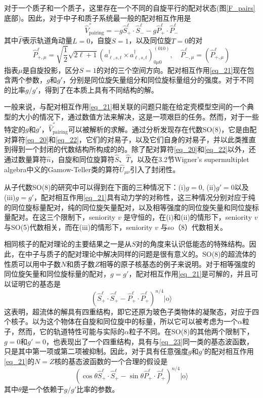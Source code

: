 对于一个质子和一个质子，这里存在一个不同的自旋平行的配对状态(图\ref{F_pairs}底部)。因此，对于中子和质子系统最一般的配对相互作用是
\begin{equation}\label{eq_21}
\hat{V}^{''}_\textrm{pairing}=-g\hat{S}^\ell_+\cdot\hat{S}^\ell_--g\hat{P}^\ell_+\cdot\hat{P}^\ell_-
\end{equation}
其中$\hat{P}$表示轨道角动量$L=0$，自旋$S=1$，以及同位旋$T=0$的对
\begin{equation}\label{eq_22}
\hat{P}^\ell_{+,\mu}=\sqrt{\frac{1}{2}}\sqrt{2\ell+1}(a^\dag_{\ell,s,t}\times a^\dag_{\ell,s,t})^{(010)}_{0\mu 0},\quad\hat{P}^\ell_{-,\mu}=\left(\hat{P}^\ell_{+,\mu}\right)
\end{equation}
指表$\mu$是自旋投影，区分$S=1$的对的三个空间方向。配对相互作用\ref{eq_21}现在包含两个参数，$g$和$g'$，分别是同位旋矢量组分和同位旋标量组分的强度。对于不同的比率$g/g'$，得到了在本质上具有不同结构的解。

一般来说，与配对相互作用\ref{eq_21}相关联的问题只能在给定壳模型空间的一个典型的大小的情况下，通过数值方法来解决，这是一项艰巨的任务。然而，对于一些特定的$g$和$g'$，$\hat{V}^{''}_\textrm{pairing}$可以被解析的求解。通过分析发现存在代数SO(8)，它是由配对算符\ref{eq_20}和\ref{eq_22}，它们的对易子，以及它们自身的对易子，并以此类推直到得到一个封闭的代数结构所构成的的。除了配对算符\ref{eq_20}和\ref{eq_22}以外，还通过数量算符$\hat{n}$，自旋和同位旋算符$\hat{S}$、$\hat{T}$，以及在3.2节Wigner's supermultiplet algebra中义的Gamow-Teller类的算符$\hat{U}_{\mu\nu}$引入了封闭性。

从子代数SO(8)的研究中可以得到在下面的三种情况下：(i)$g=0$, (ii)$g'=0$以及(iii)$g=g'$，配对相互作用\ref{eq_21}具有动力学的对称性，这三种情况分别对应于纯的同位旋标量配对，纯的同位旋矢量配对，以及相等强度的同位旋矢量和同位旋标量配对。在这三个限制下，seniority $v$ 是守恒的，在(i)和(ii)的情形下，seniority $v$ 与SO(5)代数相关，而在(iii)的情形下，seniority $v$ 与so（8）代数相关。

相同核子的配对理论的主要结果之一是从$S$对的角度来认识低能态的特殊结构。因此，在中子与质子的配对理论中解决同样的问题是很有意义的。SO(8)的超流体的性质可以用中子数$N$和质子数$Z$相等的原子核基态的例子来说明。对于相等强度的同位旋矢量和同位旋标量的配对，$g=g'$，配对相互作用\ref{eq_21}是可解的，并且可以证明它的基态是
\begin{equation}\label{eq_23}
\left(\hat{S}_+^\ell\cdot\hat{S}_+^\ell-\hat{P}_+^\ell\cdot\hat{P}_+^\ell\right)^{n/4}|\textrm{o}\rangle
\end{equation}
这表明，超流体的解具有四重结构，即它还原为玻色子类物体的凝聚态，对应于四个核子。以为这个物体在自旋和同位旋中的标量，所以它可以被考虑为一个$\alpha$粒子，然而，它的轨道特性可能与实际的$\alpha$粒子不同。在SO(8)的其他两个限制下，$g=0$和$g'=0$，也表现出了一个四重结构，具有与\ref{eq_23}同一类的基态波函数，只是其中第一项或第二项被抑制。因此，对于具有任意强度$g$和$g'$的配对相互作用\ref{eq_21}的$N=Z$核的基态波函数的一个合理的假设是
\begin{equation}\label{eq_24}
\left(\cos\theta\hat{S}^\ell_+\cdot\hat{S}^\ell_+-\sin\theta\hat{P}_+^\ell\cdot\hat{P}_+^\ell\right)^{n/4}|\textrm{o}\rangle
\end{equation}
其中$\theta$是一个依赖于$g/g'$比率的参数。

